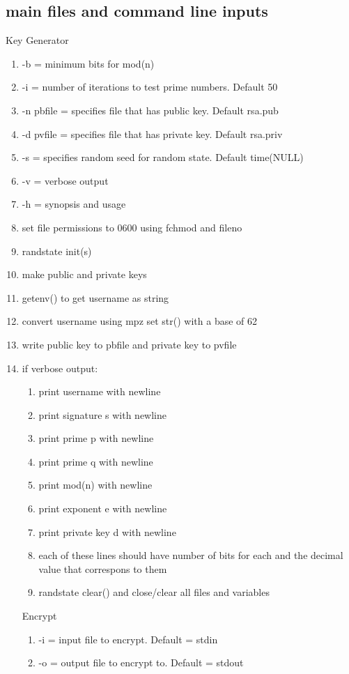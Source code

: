 \documentclass[11pt]{article}
\begin{document}
\begin{enumerate}
\section{main files and command line inputs}\label{ss:main}
Key Generator
\begin{enumerate}
\item -b = minimum bits for mod(n)
\item -i = number of iterations to test prime numbers. Default 50
\item -n pbfile = specifies file that has public key. Default rsa.pub
\item -d pvfile = specifies file that has private key. Default rsa.priv
\item -s = specifies random seed for random state. Default time(NULL)
\item -v  = verbose output
\item -h = synopsis and usage
\item set file permissions to 0600 using fchmod and fileno
\item randstate init(s)
\item make public and private keys
\item getenv() to get username as string
\item convert username using mpz set str() with a base of 62
\item write public key to pbfile and private key to pvfile
\item if verbose output:
	\begin{enumerate}
	\item print username with newline
	\item print signature s with newline
	\item print prime p with newline
	\item print prime q with newline
	\item print mod(n) with newline
	\item print exponent e with newline
	\item print private key d with newline
	\item each of these lines should have number of bits for each and the decimal value that correspons to them
\item randstate clear() and close/clear all files and variables
\end{enumerate}
Encrypt
\begin{enumerate}
\item -i = input file to encrypt. Default = stdin
\item -o = output file to encrypt to. Default = stdout

\end{enumerate}
\end{enumerate}
\end{enumerate}
\end{document}
